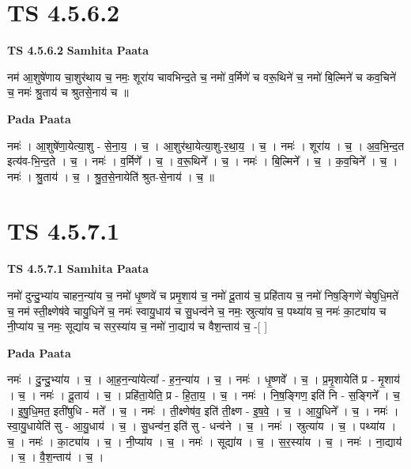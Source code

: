\documentclass[17pt]{extarticle}
\begin{document}

\section{ TS 4.5.6.2 }

\textbf{TS 4.5.6.2 } \newline
\textbf{Samhita Paata} \newline

नम॑ आ॒शुषे॑णाय चा॒शुर॑थाय च॒ नमः॒ शूरा॑य चावभिन्द॒ते च॒ नमो॑ व॒र्मिणे॑ च वरू॒थिने॑ च॒ नमो॑ बि॒ल्मिने॑ च कव॒चिने॑ च॒ नमः॑ श्रु॒ताय॑ च श्रुतसे॒नाय॑ च ॥ \newline

\textbf{Pada Paata} \newline

नमः॑ । आ॒शुषे॑णा॒येत्या॒शु - से॒ना॒य॒ । च॒ । आ॒शुर॑था॒येत्या॒शु-र॒था॒य॒ । च॒ । नमः॑ । शूरा॑य । च॒ । अ॒व॒भि॒न्द॒त इत्य॑व-भि॒न्द॒ते । च॒ । नमः॑ । व॒र्मिणे᳚ । च॒ । व॒रू॒थिने᳚ । च॒ । नमः॑ । बि॒ल्मिने᳚ । च॒ । क॒व॒चिने᳚ । च॒ । नमः॑ । श्रु॒ताय॑ । च॒ । श्रु॒त॒से॒नायेति॑ श्रुत-से॒नाय॑ । च॒ ॥  \newline





\section{ TS 4.5.7.1 }

\textbf{TS 4.5.7.1 } \newline
\textbf{Samhita Paata} \newline

नमो॑ दुन्दु॒भ्या॑य चाहन॒न्या॑य च॒ नमो॑ धृ॒ष्णवे॑ च प्रमृ॒शाय॑ च॒ नमो॑ दू॒ताय॑ च॒ प्रहि॑ताय च॒ नमो॑ निष॒ङ्गिणे॑ चेषुधि॒मते॑ च॒ नम॑ स्ती॒क्ष्णेष॑वे चायु॒धिने॑ च॒ नमः॑ स्वायु॒धाय॑ च सु॒धन्व॑ने च॒ नमः॒ स्रुत्या॑य च॒ पथ्या॑य च॒ नमः॑ का॒ट्या॑य च नी॒प्या॑य च॒ नमः॒ सूद्या॑य च सर॒स्या॑य च॒ नमो॑ ना॒द्याय॑ च वैश॒न्ताय॑ च॒ -[  ] \newline

\textbf{Pada Paata} \newline

नमः॑ । दु॒न्दु॒भ्या॑य । च॒ । आ॒ह॒न॒न्या॑येत्या᳚ - ह॒न॒न्या॑य । च॒ । नमः॑ । धृ॒ष्णवे᳚ । च॒ । प्र॒मृ॒शायेति॑ प्र - मृ॒शाय॑ । च॒ । नमः॑ । दू॒ताय॑ । च॒ । प्रहि॑ता॒येति॒ प्र - हि॒ता॒य॒ । च॒ । नमः॑ । नि॒ष॒ङ्गिण॒ इति॑ नि - स॒ङ्गिने᳚ । च॒ । इ॒षु॒धि॒मत॒ इती॑षुधि - मते᳚ । च॒ । नमः॑ । ती॒क्ष्णेष॑व॒ इति॑ ती॒क्ष्ण - इ॒ष॒वे॒ । च॒ । आ॒यु॒धिने᳚ । च॒ । नमः॑ । स्वा॒यु॒धायेति॑ सु - आ॒यु॒धाय॑ । च॒ । सु॒धन्व॑न॒ इति॑ सु - धन्व॑ने । च॒ । नमः॑ । स्रुत्या॑य । च॒ । पथ्या॑य । च॒ । नमः॑ । का॒ट्या॑य । च॒ । नी॒प्या॑य । च॒ । नमः॑ । सूद्या॑य । च॒ । स॒र॒स्या॑य । च॒ । नमः॑ । ना॒द्याय॑ । च॒ । वै॒श॒न्ताय॑ । च॒ ।  \newline
\end{document}
